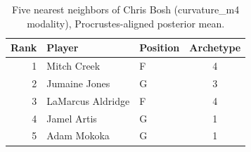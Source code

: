 \begin{table}[htbp]
  \centering\small
  \begin{tabular}{rllc}
    \toprule
    Rank & Player & Position & Archetype \\
    \midrule
    1 & Mitch Creek & F & 4 \\
    2 & Jumaine Jones & G & 3 \\
    3 & LaMarcus Aldridge & F & 4 \\
    4 & Jamel Artis & G & 1 \\
    5 & Adam Mokoka & G & 1 \\
    \bottomrule
  \end{tabular}
  \caption{Five nearest neighbors of Chris Bosh (curvature_m4 modality), Procrustes-aligned posterior mean.}
  \label{tab:Chris_Bosh_neighbors_curvature_m4}
\end{table}

